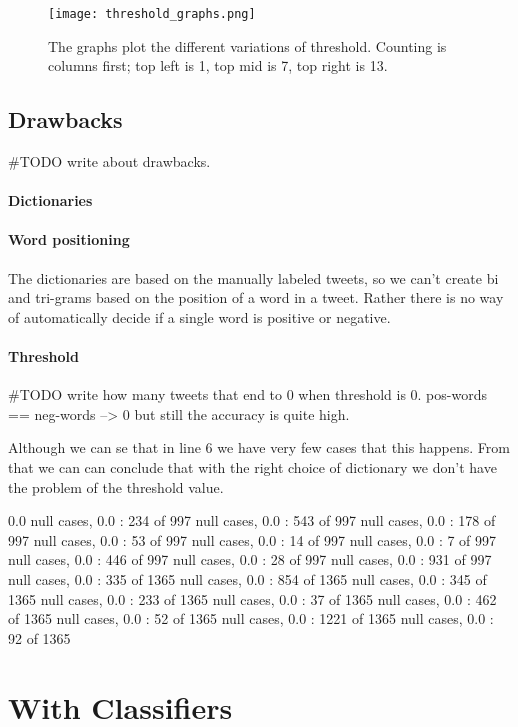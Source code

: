 \begin{figure}[htb]
    \centering
    \texttt{[image: threshold\_graphs.png]} 
    \caption{The graphs plot the different variations of threshold. Counting is
columns first; top left is 1, top mid is 7, top right is 13.}
    \label{fig:threshold_graphs}
\end{figure}

\subsection{Drawbacks}
#TODO write about drawbacks.
\paragraph{Dictionaries}
\paragraph{Word positioning}
The dictionaries are based on the manually labeled
tweets, so we can't create bi and tri-grams based on the position of a word in a tweet.
Rather there is no way of automatically decide if a single word is positive or
negative. 

\paragraph{Threshold}
#TODO write how many tweets that end to 0 when threshold is 0.
pos-words == neg-words --> 0 but still the accuracy is quite high.

Although we can se that in line 6 we have very few cases that this happens.
From that we can can conclude that with the right choice of dictionary we don't
have the problem of the threshold value. 

0.0
null cases, 0.0 : 234 of 997
null cases, 0.0 : 543 of 997
null cases, 0.0 : 178 of 997
null cases, 0.0 : 53 of 997
null cases, 0.0 : 14 of 997
null cases, 0.0 : 7 of 997
null cases, 0.0 : 446 of 997
null cases, 0.0 : 28 of 997
null cases, 0.0 : 931 of 997
null cases, 0.0 : 335 of 1365
null cases, 0.0 : 854 of 1365
null cases, 0.0 : 345 of 1365
null cases, 0.0 : 233 of 1365
null cases, 0.0 : 37 of 1365
null cases, 0.0 : 462 of 1365
null cases, 0.0 : 52 of 1365
null cases, 0.0 : 1221 of 1365
null cases, 0.0 : 92 of 1365

\section{With Classifiers}\label{sentiment:classifier_classification}

